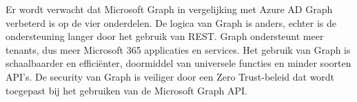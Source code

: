 \begin{comment}

Hier beschrijf je welke resultaten je verwacht. Als je metingen en simulaties uitvoert, kan je hier al mock-ups maken van de grafieken samen met de verwachte conclusies. Benoem zeker al je assen en de onderdelen van de grafiek die je gaat gebruiken. Dit zorgt ervoor dat je concreet weet welk soort data je moet verzamelen en hoe je die moet meten.

Wat heeft de doelgroep van je onderzoek aan het resultaat? Op welke manier zorgt jouw bachelorproef voor een meerwaarde?

Hier beschrijf je wat je verwacht uit je onderzoek, met de motivatie waarom. Het is \textbf{niet} erg indien uit je onderzoek andere resultaten en conclusies vloeien dan dat je hier beschrijft: het is dan juist interessant om te onderzoeken waarom jouw hypothesen niet overeenkomen met de resultaten.



Er wordt verwacht dat alle niet Microsoft-\newline{}gerelateerde Infrastructure Automation tools de nodige Azure configuraties kunnen opzetten voor een testomgeving. Hoewel Ansible en Terraform een opmerkelijk beter potentieel hebben ten opzichte van de andere tools. Dit gaat gepaard met meer mogelijkheden binnen Azure. In vergelijking met de andere tools, zitten Ansible en Terraform in een continue ontwikkelingscyclus door het jonge toetreden tot de IT-sector. Beide tools scoren goed op vlak van logica, leesbaarheid, documentatie, community en limieten. In tegenstelling tot de andere tools die eerder op vlak van verwerkingssnelheid domineren. 

Vervolgens wordt er uit het onderzoek verwacht dat het automatiseren van Azure configuraties alleen maar voordelen heeft. Het enige nadeel in verband met de Infrastructure Automation tools is het leerproces om de tools onder de knie te hebben. Toch wordt dit ook als een voordeel gezien, omwille de tools buiten Azure populair zijn en ondersteund worden. Door het gebruik van deze automatisatie wordt de efficiëntie aanzienlijk verhoogd. Vervolgens biedt het de mogelijkheid tot Disaster Recovery aan. Daarbovenop is de kans tot menselijke fouten opmerkelijk verkleind.

\end{comment}

Er wordt verwacht dat Microsoft Graph in vergelijking met Azure AD Graph verbeterd is op de vier onderdelen. De logica van Graph is anders, echter is de ondersteuning langer door het gebruik van REST. Graph ondersteunt meer tenants, dus meer Microsoft 365 applicaties en services. Het gebruik van Graph is schaalbaarder en efficiënter, doormiddel van universele functies en minder soorten API’s. De security van Graph is veiliger door een Zero Trust-beleid dat wordt toegepast bij het gebruiken van de Microsoft Graph API.

